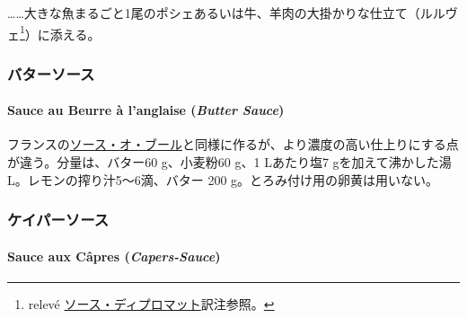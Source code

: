 \begin{recette}
\ldots{}\ldots{}大きな魚まるごと1尾のポシェあるいは牛、羊肉の大掛かりな仕立て（ルルヴェ\footnote{relevé
  \protect\hyperlink{sauce-diplomate}{ソース・ディプロマット}訳注参照。}）に添える。

\maeaki

\hypertarget{ux30d0ux30bfux30fcux30bdux30fcux30b9}{%
\subsubsection{バターソース}\label{ux30d0ux30bfux30fcux30bdux30fcux30b9}}

\hypertarget{butter-sauce}{%
\paragraph{\texorpdfstring{Sauce au Beurre à l'anglaise (\emph{Butter
Sauce})}{Sauce au Beurre à l'anglaise (Butter Sauce)}}\label{butter-sauce}}


フランスの\protect\hyperlink{sauce-au-beurre}{ソース・オ・ブール}と同様に作るが、より濃度の高い仕上りにする点が違う。分量は、バター60
g、小麦粉60 g、1 Lあたり塩7 gを加えて沸かした湯\troisquarts{}
L。レモンの搾り汁5〜6滴、バター 200 g。とろみ付け用の卵黄は用いない。

\maeaki

\hypertarget{ux30b1ux30a4ux30d1ux30fcux30bdux30fcux30b9}{%
\subsubsection{ケイパーソース}\label{ux30b1ux30a4ux30d1ux30fcux30bdux30fcux30b9}}

\hypertarget{capers-sauce}{%
\paragraph{\texorpdfstring{Sauce aux Câpres
(\emph{Capers-Sauce})}{Sauce aux Câpres (Capers-Sauce)}}\label{capers-sauce}}


\end{recette}
